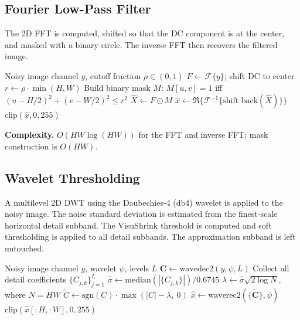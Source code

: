 \documentclass[conference]{IEEEtran}
\begin{document}
\subsection{Fourier Low-Pass Filter}

The 2D FFT is computed, shifted so that the DC component is at the center, and masked with a binary circle. The inverse FFT then recovers the filtered image.

\begin{algorithm}
\caption{Fourier Low-Pass Filter}
\begin{algorithmic}[1]
\Require Noisy image channel $y$, cutoff fraction $\rho \in (0,1)$
\State $F \leftarrow \mathcal{F}\{y\}$; shift DC to center
\State $r \leftarrow \rho \cdot \min(H, W)$
\State Build binary mask $M$: $M[u,v] = 1$ iff $(u-H/2)^2 + (v-W/2)^2 \leq r^2$
\State $\hat{X} \leftarrow F \odot M$
\State $\hat{x} \leftarrow \Re\{\mathcal{F}^{-1}\{\text{shift back}(\hat{X})\}\}$
\State \Return $\text{clip}(\hat{x}, 0, 255)$
\end{algorithmic}
\end{algorithm}

\textbf{Complexity.} $O(HW \log(HW))$ for the FFT and inverse FFT; mask construction is $O(HW)$.

\subsection{Wavelet Thresholding}

A multilevel 2D DWT using the Daubechies-4 (db4) wavelet is applied to the noisy image. The noise standard deviation is estimated from the finest-scale horizontal detail subband. The VisuShrink threshold is computed and soft thresholding is applied to all detail subbands. The approximation subband is left untouched.

\begin{algorithm}
\caption{Wavelet Soft Thresholding (VisuShrink)}
\begin{algorithmic}[1]
\Require Noisy image channel $y$, wavelet $\psi$, levels $L$
\State $\mathbf{C} \leftarrow \text{wavedec2}(y, \psi, L)$
\State Collect all detail coefficients $\{C_{j,k}\}_{j=1}^{L}$
\State $\hat{\sigma} \leftarrow \text{median}(|\{C_{j,k}\}|) / 0.6745$
\State $\lambda \leftarrow \hat{\sigma}\sqrt{2\log N}$, where $N = HW$
  \State $\tilde{C} \leftarrow \text{sgn}(C) \cdot \max(|C| - \lambda,\ 0)$
\EndFor
\State $\hat{x} \leftarrow \text{waverec2}(\{\tilde{\mathbf{C}}\}, \psi)$
\State \Return $\text{clip}(\hat{x}[:H, :W], 0, 255)$
\end{algorithmic}
\end{algorithm}
\end{document}
